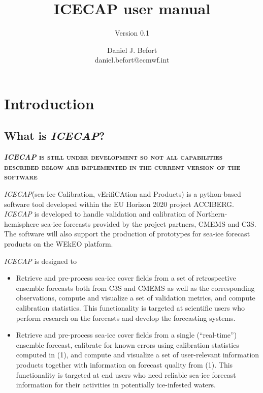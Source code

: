 \documentclass[DIV=10, parskip=full]{scrreprt}
\title{ICECAP user manual}
\subtitle{Version 0.1}
\author{Daniel J. Befort \\ daniel.befort@ecmwf.int}
\newcommand{\ice}{\textit{ICECAP}\xspace}
\newcommand{\highlight}[1]{\textsc{\textbf{#1}}}
\begin{document}
\maketitle

\tableofcontents

\chapter{Introduction}

\section{What is \ice?}
\highlight{\ice is still under development so not all capabilities described below are implemented in the current version of the software}

\ice (sea-Ice Calibration, vErifiCAtion and Products) is a python-based software tool developed within the EU Horizon 2020 project ACCIBERG. \ice is developed to handle validation and calibration of Northern-hemisphere sea-ice forecasts provided by the project partners, CMEMS and C3S. The software will also support the production of prototypes for sea-ice forecast products on the WEkEO platform. 

\ice is designed to 
\begin{itemize}
	\item Retrieve and pre-process sea-ice cover fields from a set of retrospective ensemble forecasts both from C3S and CMEMS as well as the corresponding observations, compute and visualize a set of validation metrics, and compute calibration statistics. This functionality is targeted at scientific users who perform research on the forecasts and develop the forecasting systems.
	\item Retrieve and pre-process sea-ice cover fields from a single (“real-time”) ensemble forecast, calibrate for known errors using calibration statistics computed in (1), and compute and visualize a set of user-relevant information products together with information on forecast quality from (1). This functionality is targeted at end users who need reliable sea-ice forecast information for their activities in potentially ice-infested waters.
\end{itemize}
\end{document}
